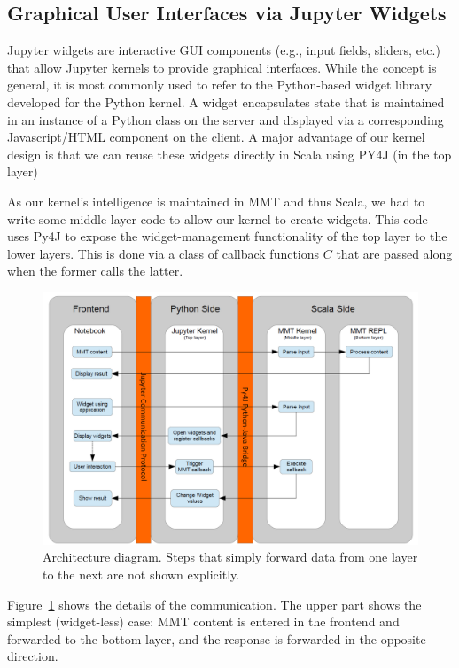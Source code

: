 \subsection{Graphical User Interfaces via Jupyter Widgets}\label{sec:kernel:widgets}


Jupyter widgets are interactive GUI components (e.g., input fields, sliders, etc.) that allow Jupyter kernels to provide graphical interfaces.
While the concept is general, it is most commonly used to refer to the Python-based widget library developed for the Python kernel.
A widget encapsulates state that is maintained in an instance of a Python class on the server and displayed via a corresponding Javascript/HTML component on the client.
A major advantage of our kernel design is that we can reuse these widgets directly in Scala using PY4J (in the top layer)

As our kernel's intelligence is maintained in MMT and thus Scala, we had to write some middle layer code to allow our kernel to create widgets.
This code uses Py4J to expose the widget-management functionality of the top layer to the lower layers.
This is done via a class of callback functions $C$ that are passed along when the former calls the latter.

\begin{figure}[ht]\centering
  \includegraphics[width=12cm]{../D4.11/ArchitectureDiagram}
  \caption{
    Architecture diagram.
    Steps that simply forward data from one layer to the next are not shown explicitly. 
  }\label{fig:architecture-diagram}
\end{figure}

Figure~\ref{fig:architecture-diagram} shows the details of the communication.
The upper part shows the simplest (widget-less) case: MMT content is entered in the frontend and forwarded to the bottom layer, and the response is forwarded in the opposite direction. 

